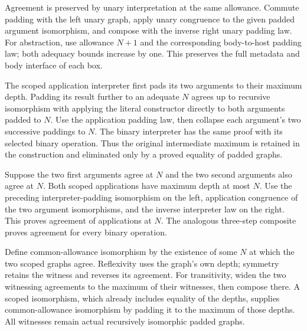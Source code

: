 

Agreement is preserved by unary interpretation at the same allowance. Commute
padding with the left unary graph, apply unary congruence to the given padded
argument isomorphism, and compose with the inverse right unary padding law.
For abstraction, use allowance $N+1$ and the corresponding body-to-host
padding law; both adequacy bounds increase by one. This preserves the full
metadata and body interface of each box.




The scoped application interpreter first pads its two arguments to their
maximum depth. Padding its result further to an adequate $N$ agrees up to
recursive isomorphism with applying the literal constructor directly to
both arguments padded to $N$. Use the application padding law, then collapse
each argument's two successive paddings to $N$. The binary interpreter has
the same proof with its selected binary operation. Thus the original
intermediate maximum is retained in the construction and eliminated only
by a proved equality of padded graphs.




Suppose the two first arguments agree at $N$ and the two second arguments
also agree at $N$. Both scoped applications have maximum depth at most $N$.
Use the preceding interpreter-padding isomorphism on the left, application
congruence of the two argument isomorphisms, and the inverse interpreter law
on the right. This proves agreement of applications at $N$. The analogous
three-step composite proves agreement for every binary operation.




Define common-allowance isomorphism by the existence of some $N$ at which
the two scoped graphs agree. Reflexivity uses the graph's own depth; symmetry
retains the witness and reverses its agreement. For transitivity, widen the
two witnessing agreements to the maximum of their witnesses, then compose
there. A scoped isomorphism, which already includes equality of the depths,
supplies common-allowance isomorphism by padding it to the maximum of those
depths. All witnesses remain actual recursively isomorphic padded graphs.


